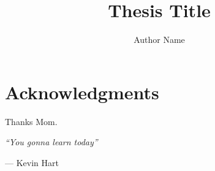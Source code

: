 \title{Thesis Title}
\author{Author Name}



\maketitle
\clearpage
{}
\begin{abstractpage}
  
\end{abstractpage}
\clearpage
\setcounter{page}{3}
\section*{Acknowledgments}
Thanks Mom.

\vfill
\begin{center}\textit{``You gonna learn today''}\end{center}
\begin{flushright}--- Kevin Hart\end{flushright}